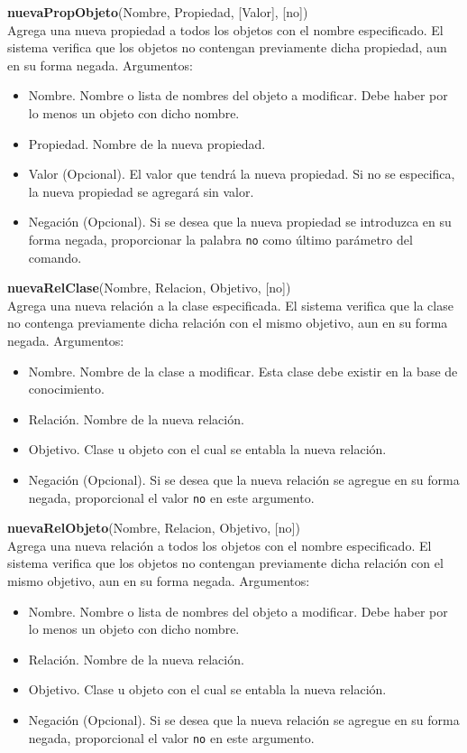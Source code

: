 \documentclass[11pt]{article}
\newcommand{\comando}[2]{
    \textbf{#1}(#2)\\
}
\newenvironment{args}{
    \newline
    Argumentos:
    \begin{itemize}
}{
    \end{itemize}
    \bigskip
}
\begin{document}
\comando{nuevaPropObjeto}{Nombre, Propiedad, [Valor], [no]}
Agrega una nueva propiedad a todos los objetos con el nombre especificado. El sistema verifica que los objetos no contengan previamente dicha propiedad, aun en su forma negada.
\begin{args}
    \item Nombre. Nombre o lista de nombres del objeto a modificar. Debe haber por lo menos un objeto con dicho nombre.
    \item Propiedad. Nombre de la nueva propiedad.
    \item Valor (Opcional). El valor que tendrá la nueva propiedad. Si no se especifica, la nueva propiedad se agregará sin valor.
    \item Negación (Opcional). Si se desea que la nueva propiedad se introduzca en su forma negada, proporcionar la palabra \texttt{no} como último parámetro del comando.
\end{args}

\comando{nuevaRelClase}{Nombre, Relacion, Objetivo, [no]}
Agrega una nueva relación a la clase especificada. El sistema verifica que la clase no contenga previamente dicha relación con el mismo objetivo, aun en su forma negada.
\begin{args}
    \item Nombre. Nombre de la clase a modificar. Esta clase debe existir en la base de conocimiento.
    \item Relación. Nombre de la nueva relación.
    \item Objetivo. Clase u objeto con el cual se entabla la nueva relación.
    \item Negación (Opcional). Si se desea que la nueva relación se agregue en su forma negada, proporcional el valor \texttt{no} en este argumento.
\end{args}

\comando{nuevaRelObjeto}{Nombre, Relacion, Objetivo, [no]}
Agrega una nueva relación a todos los objetos con el nombre especificado. El sistema verifica que los objetos no contengan previamente dicha relación con el mismo objetivo, aun en su forma negada.
\begin{args}
    \item Nombre. Nombre o lista de nombres del objeto a modificar. Debe haber por lo menos un objeto con dicho nombre.
    \item Relación. Nombre de la nueva relación.
    \item Objetivo. Clase u objeto con el cual se entabla la nueva relación.
    \item Negación (Opcional). Si se desea que la nueva relación se agregue en su forma negada, proporcional el valor \texttt{no} en este argumento.
\end{args}
\end{document}
